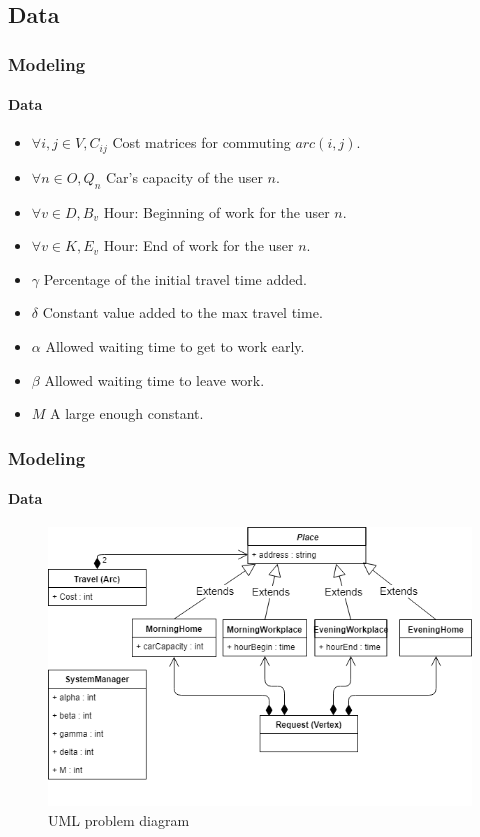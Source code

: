 \documentclass{beamer}
\begin{document}
	\subsection{Data}
	\begin{frame}
		\frametitle{Modeling}
		\framesubtitle{Data}
		\begin{itemize}
		\item $\forall i, j\in V, C_{ij}$ Cost matrices for commuting $arc(i, j)$.
		\item $\forall n\in O, Q_{n}$ Car's capacity of the user $n$. 
		\item $\forall v\in D, B_{v}$ Hour: Beginning of work for the user $n$. 
		\item $\forall v\in K, E_{v}$ Hour: End of work for the user $n$.
		\item $\gamma$ Percentage of the initial travel time added. 
		\item $\delta$ Constant value added to the max travel time. 
		\item $\alpha$ Allowed waiting time to get to work early. 
		\item $\beta$ Allowed waiting time to leave work. 
		\item $M$ A large enough constant. 
	\end{itemize}
	\end{frame}
	\begin{frame}
		\frametitle{Modeling}
		\framesubtitle{Data}
		\begin{figure}
		\centering
			\includegraphics[width=1\textwidth]{img/i_umlproblemdata.png}
		\caption{UML problem diagram}
		\label{fig:UML Diagram}
	\end{figure}
	\end{frame}
\end{document}
